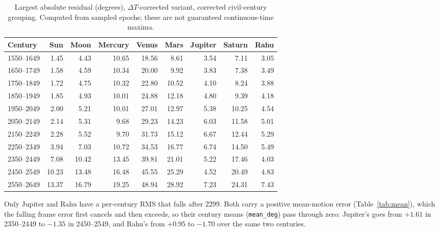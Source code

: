 \documentclass[11pt,a4paper]{article}
\newcommand{\toprule}{\hline\hline}%
\newcommand{\midrule}{\hline}%
\newcommand{\bottomrule}{\hline\hline}}
\newcommand{\dT}{$\Delta T$}
\newcommand{\file}[1]{\texttt{#1}}
\begin{document}
\begin{table}[htbp]
\centering
\caption{Largest absolute residual (degrees), \dT{}-corrected variant, corrected civil-century grouping. Computed from sampled epochs; these are not guaranteed continuous-time maxima.}
\label{tab:max}
\small
\begin{tabular}{@{}lrrrrrrrr@{}}
\toprule
Century & Sun & Moon & Mercury & Venus & Mars & Jupiter & Saturn & Rahu \\
\midrule
1550--1649 & 1.45 & 4.43 & 10.65 & 18.56 & 8.61 & 3.54 & 7.11 & 3.05 \\
1650--1749 & 1.58 & 4.59 & 10.34 & 20.00 & 9.92 & 3.83 & 7.38 & 3.49 \\
1750--1849 & 1.72 & 4.75 & 10.32 & 22.80 & 10.52 & 4.10 & 8.24 & 3.88 \\
1850--1949 & 1.85 & 4.93 & 10.01 & 24.88 & 12.18 & 4.80 & 9.39 & 4.18 \\
1950--2049 & 2.00 & 5.21 & 10.01 & 27.01 & 12.97 & 5.38 & 10.25 & 4.54 \\
2050--2149 & 2.14 & 5.31 & 9.68 & 29.23 & 14.23 & 6.03 & 11.58 & 5.01 \\
2150--2249 & 2.28 & 5.52 & 9.70 & 31.73 & 15.12 & 6.67 & 12.44 & 5.29 \\
2250--2349 & 3.94 & 7.03 & 10.72 & 34.53 & 16.77 & 6.74 & 14.50 & 5.49 \\
2350--2449 & 7.08 & 10.42 & 13.45 & 39.81 & 21.01 & 5.22 & 17.46 & 4.03 \\
2450--2549 & 10.23 & 13.48 & 16.48 & 45.55 & 25.29 & 4.52 & 20.49 & 4.83 \\
2550--2649 & 13.37 & 16.79 & 19.25 & 48.94 & 28.92 & 7.23 & 24.31 & 7.43 \\
\bottomrule
\end{tabular}
\end{table}

Only Jupiter and Rahu have a per-century RMS that falls after 2299. Both carry a positive mean-motion error (Table~\ref{tab:mean}), which the falling frame error first cancels and then exceeds, so their century means (\file{mean\_deg}) pass through zero: Jupiter's goes from $+1.61$ in 2350--2449 to $-1.35$ in 2450--2549, and Rahu's from $+0.95$ to $-1.70$ over the same two centuries.
\end{document}
